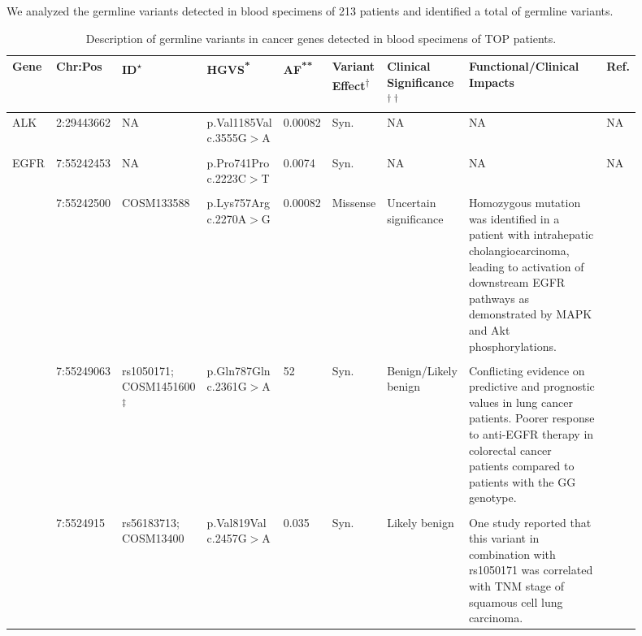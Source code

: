 We analyzed the germline variants detected in blood specimens of 213 patients and identified a total of  germline variants.




\begin{landscape}

\begin{longtable}{p{0.07\linewidth}|p{0.09\linewidth}p{0.11\linewidth}p{0.1\linewidth}p{0.05\linewidth}p{0.065\linewidth}p{0.11\linewidth}p{0.25\linewidth}p{0.05\linewidth}}
		\caption{Description of germline variants in cancer genes detected in blood specimens of TOP patients.}
    \label{tbl:germline_cancer_genes}
		\\
    \hline
    Gene & Chr:Pos & ID\textsuperscript{$\star$} & HGVS\textsuperscript{*} & AF\textsuperscript{**} & Variant Effect\textsuperscript{$\dagger$} & Clinical Significance\textsuperscript{$\dagger\dagger$} & Functional/Clinical Impacts & Ref.
		\\
    \hline
		ALK & 2:29443662 & NA & p.Val1185Val c.3555G$>$A & 0.00082 & Syn. & NA & NA & NA
		\\
		\\
		\hline
		EGFR & 7:55242453 & NA & p.Pro741Pro c.2223C$>$T & 0.0074 & Syn. & NA & NA & NA
		\\
		\\
		& 7:55242500 & COSM133588 & p.Lys757Arg c.2270A$>$G & 0.00082 & Missense & Uncertain \mbox{significance} & Homozygous mutation was identified in a patient with intrahepatic cholangiocarcinoma, leading to activation of downstream EGFR pathways as demonstrated by MAPK and Akt phosphorylations. & \cite{Leone2006}
		\\
		\\
		& 7:55249063 & rs1050171; COSM1451600\textsuperscript{$\ddagger$} & p.Gln787Gln c.2361G$>$A & 52 & Syn. & Benign/Likely benign & Conflicting evidence on predictive and prognostic values in lung cancer patients. Poorer response to anti-EGFR therapy in colorectal cancer patients compared to patients with the GG genotype. & \cite{Zhang2006a, Leichsenring2017, Wang2013, Bonin2016}
		\\
		\\
		& 7:5524915 & rs56183713; COSM13400 & p.Val819Val c.2457G$>$A & 0.035 & Syn. & Likely benign & One study reported that this variant in combination with rs1050171 was correlated with TNM stage of squamous cell lung carcinoma. & \cite{Wang2013}

\end{longtable}
\end{landscape}
